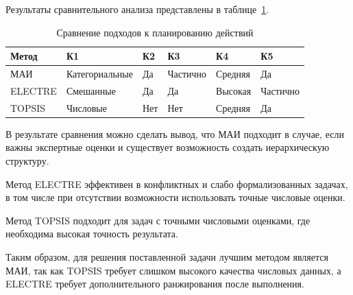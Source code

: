 Результаты сравнительного анализа представлены в таблице~\ref{tbl:comparison}.
\begin{table}[h]
	\centering
	\begin{threeparttable}
		\caption{Сравнение подходов к планированию действий}
		\label{tbl:comparison}
		
		\begin{tabularx}{\textwidth}{|p{2.5cm}|p{3.5cm}|X|p{2cm}|p{2cm}|X|}
			\hline
			\textbf{Метод} & \textbf{К1} & \textbf{К2} & \textbf{К3} & \textbf{К4} & \textbf{К5} \\
			\hline
			МАИ & Категориальные & Да & Частично & Средняя & Да \\
			\hline
			ELECTRE & Смешанные & Да & Да & Высокая & Частично \\
			\hline
			TOPSIS & Числовые & Нет & Нет & Средняя & Да \\
			\hline
		\end{tabularx}
	\end{threeparttable}
\end{table}

В результате сравнения можно сделать вывод, что МАИ подходит в случае, если важны экспертные оценки и существует возможность создать иерархическую структуру.

Метод ELECTRE эффективен в конфликтных и слабо формализованных задачах, в том числе при отсутствии возможности использовать точные числовые оценки.

Метод TOPSIS подходит для задач с точными числовыми оценками, где необходима высокая точность результата.

Таким образом, для решения поставленной задачи лучшим методом является МАИ, так как TOPSIS требует слишком высокого качества числовых данных, а ELECTRE требует дополнительного ранжирования после выполнения.